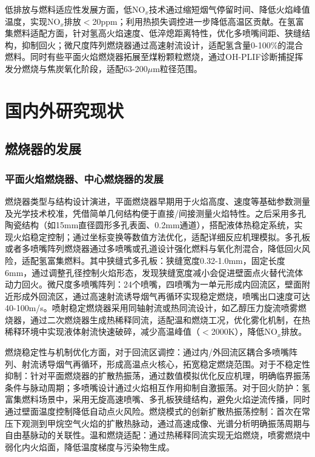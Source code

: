 低排放与燃料适应性发展方面，低NO$_x$技术通过缩短烟气停留时间、降低火焰峰值温度，实现NO$_x$排放$<$20ppm；利用热损失调控进一步降低高温区贡献。在氢富集燃料适配方面，针对氢高火焰速度、低淬熄距离特性，优化多喷嘴间距、狭缝结构，抑制回火\cite{koser2017investigation}；微尺度阵列燃烧器通过高速射流设计，适配氢含量0-100\%的混合燃料。同时有些平面火焰燃烧器拓展至煤粉颗粒燃烧，通过OH-PLIF诊断捕捉挥发分燃烧与焦炭氧化阶段，适配63-200$\mu$m粒径范围\cite{koser2019multi}。

\section{国内外研究现状}

\subsection{燃烧器的发展}

\subsubsection{平面火焰燃烧器、中心燃烧器的发展}

燃烧器类型与结构设计演进，平面燃烧器早期用于火焰高度、速度等基础参数测量及光学技术校准，凭借简单几何结构便于直接/间接测量火焰特性。之后采用多孔陶瓷结构（如15mm直径圆形多孔表面、0.2mm通道），搭配液体热稳定系统，实现火焰稳定控制；通过坐标变换等数值方法优化，适配详细反应机理模拟。多孔板或者多喷嘴阵列燃烧器通过多喷嘴或孔道设计强化燃料与氧化剂混合，降低回火风险，适配氢富集燃料。其中狭缝式多孔板：狭缝宽度0.32-1.0mm，固定长度6mm，通过调整孔径控制火焰形态，发现狭缝宽度减小会促进壁面点火替代流体动力回火。微尺度多喷嘴阵列：24个喷嘴，四喷嘴为一单元形成内回流区，壁面附近形成外回流区，通过高速射流诱导烟气再循环实现稳定燃烧，喷嘴出口速度可达40-100m/s。喷射稳定燃烧器采用同轴射流或热同流设计，如乙醇压力旋流喷雾燃烧器，通过二次燃烧器生成热稀释同流，适配温和燃烧工况，优化雾化机制，在热稀释环境中实现液体射流快速破碎，减少高温峰值（$<$2000K），降低NO$_x$排放\cite{xu2018characterization}。

燃烧稳定性与机制优化方面，对于回流区调控：通过内/外回流区耦合多喷嘴阵列、射流诱导烟气再循环，形成高温点火核心，拓宽稳定燃烧范围。对于不稳定性抑制：针对平面燃烧器的扩散热振荡，通过数值模拟优化反应机理，明确临界振荡条件与脉动周期；多喷嘴设计通过火焰相互作用抑制自激振荡\cite{liu2022investigation}。对于回火防护：氢富集燃料场景中，采用无旋高速喷嘴、多孔板狭缝结构，避免火焰逆流传播，同时通过壁面温度控制降低自动点火风险。燃烧模式的创新扩散热振荡控制：首次在常压下观测到甲烷空气火焰的扩散热脉动，通过高速成像、光谱分析明确振荡周期与自由基脉动的关联性。温和燃烧适配：通过热稀释同流实现无焰燃烧，喷雾燃烧中弱化内火焰面，降低温度梯度与污染物生成\cite{pers2024transition}。

